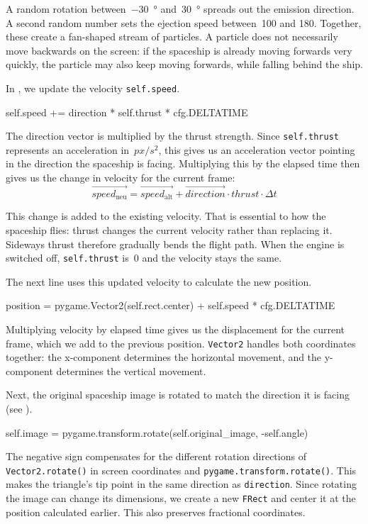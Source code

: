 A random rotation between~\SI{-30}{\degree} and~\SI{30}{\degree} spreads out the emission direction. A second random number sets the ejection speed between~100 and \SI{180}{\pxsec}. Together, these create a fan-shaped stream of particles. A particle does not necessarily move backwards on the screen: if the spaceship is already moving forwards very quickly, the particle may also keep moving forwards, while falling behind the ship.

\newpage
In , we update the velocity \texttt{self.speed}. 
\begin{codebox}
	self.speed += direction * self.thrust * cfg.DELTATIME
\end{codebox}
The direction vector is multiplied by the thrust strength. Since \texttt{self.thrust} represents an acceleration in~$px/s^2$, this gives us an acceleration vector pointing in the direction the spaceship is facing. Multiplying this by the elapsed time then gives us the change in velocity for the current frame:
\[
\overrightarrow{speed_{\mathrm{neu}}}
= \overrightarrow{speed_{\mathrm{alt}}}
+ \overrightarrow{direction} \cdot thrust \cdot \Delta t
\]

This change is added to the existing velocity. That is essential to how the spaceship flies: thrust changes the current velocity rather than replacing it. Sideways thrust therefore gradually bends the flight path. When the engine is switched off, \texttt{self.thrust} is~0 and the velocity stays the same.

The next line uses this updated velocity to calculate the new position. 
\begin{codebox}
	position = pygame.Vector2(self.rect.center) + self.speed * cfg.DELTATIME
\end{codebox}
Multiplying velocity by elapsed time gives us the displacement for the current frame, which we add to the previous position. \texttt{Vector2} handles both coordinates together: the x-component determines the horizontal movement, and the y-component determines the vertical movement.

Next, the original spaceship image is rotated to match the direction it is facing (see ). 
\begin{codebox}
	self.image = pygame.transform.rotate(self.original_image, -self.angle)
\end{codebox}
The negative sign compensates for the different rotation directions of \texttt{Vector2.rotate()} in screen coordinates and \texttt{pygame.transform.rotate()}. This makes the triangle's tip point in the same direction as \texttt{direction}. Since rotating the image can change its dimensions, we create a new \texttt{FRect} and center it at the position calculated earlier. This also preserves fractional coordinates.

